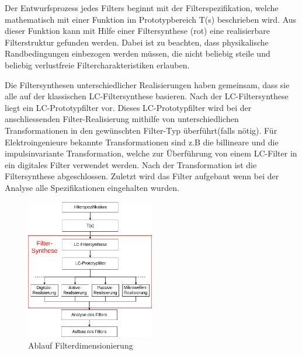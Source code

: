 Der Entwurfsprozess jedes Filters beginnt mit der Filterspezifikation, welche mathematisch mit einer Funktion im Prototypbereich T(s) beschrieben wird. Aus dieser Funktion kann mit Hilfe einer Filtersynthese (rot) eine realisierbare Filterstruktur gefunden werden. Dabei ist zu beachten, dass  physikalische Randbedingungen einbezogen werden müssen, die nicht beliebig steile und beliebig verlustfreie Filtercharakteristiken erlauben.

Die Filtersynthesen unterschiedlicher Realisierungen haben gemeinsam, dass sie alle auf der klassischen LC-Filtersynthese basieren. Nach der LC-Filtersynthese liegt ein LC-Prototypfilter vor. Dieses LC-Prototypfilter wird bei der anschliessenden Filter-Realisierung mithilfe von unterschiedlichen Transformationen in den gewünschten Filter-Typ überführt(falls nötig). Für Elektroingenieure bekannte Transformationen sind z.B die billineare und die impulsinvariante Transformation, welche zur Überführung von einem LC-Filter in ein digitales Filter verwendet werden. Nach der Transformation ist die Filtersynthese abgeschlossen. Zuletzt wird das Filter aufgebaut wenn bei der Analyse alle Spezifikationen eingehalten wurden.

\begin{figure}[h!]
\centering
 	\includegraphics[width=0.5\textwidth]{Ablauf_Filterdimensionierung_Allgemein.png}
 	\caption{Ablauf Filterdimensionierung}
 	\label{fig:Ablauf_Filterdimensionierung_Allgemein}
\end{figure}


